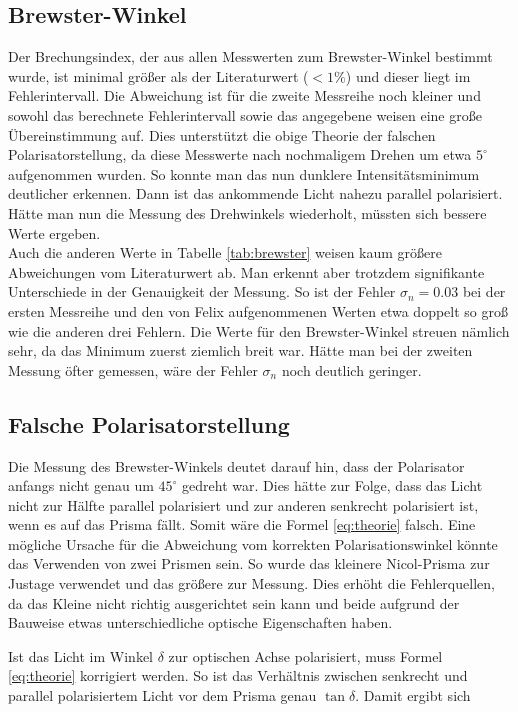\documentclass[12pt,a4paper,titlepage,headinclude,bibtotoc]{scrartcl}
\begin{document}
\subsection{Brewster-Winkel}
Der Brechungsindex, der aus allen Messwerten zum Brewster-Winkel bestimmt wurde, ist minimal größer als der Literaturwert ($< 1\%$) und dieser liegt im Fehlerintervall.
Die Abweichung ist für die zweite Messreihe noch kleiner und sowohl das berechnete Fehlerintervall sowie das angegebene weisen eine große Übereinstimmung auf.
Dies unterstützt die obige Theorie der falschen Polarisatorstellung, da diese Messwerte nach nochmaligem Drehen um etwa $5^\circ$ aufgenommen wurden.
So konnte man das nun dunklere Intensitätsminimum deutlicher erkennen.
Dann ist das ankommende Licht nahezu parallel polarisiert.
Hätte man nun die Messung des Drehwinkels wiederholt, müssten sich bessere Werte ergeben.\\

Auch die anderen Werte in Tabelle \ref{tab:brewster} weisen kaum größere Abweichungen vom Literaturwert ab.
Man erkennt aber trotzdem signifikante Unterschiede in der Genauigkeit der Messung.
So ist der Fehler $\sigma_n=0.03$ bei der ersten Messreihe und den von Felix aufgenommenen Werten etwa doppelt so groß wie die anderen drei Fehlern.
Die Werte für den Brewster-Winkel streuen nämlich sehr, da das Minimum zuerst ziemlich breit war.
Hätte man bei der zweiten Messung öfter gemessen, wäre der Fehler $\sigma_n$ noch deutlich geringer.

\subsection{Falsche Polarisatorstellung}
Die Messung des Brewster-Winkels deutet darauf hin, dass der Polarisator anfangs nicht genau um $45^\circ$ gedreht war.
Dies hätte zur Folge, dass das Licht nicht zur Hälfte parallel polarisiert und zur anderen senkrecht polarisiert ist, wenn es auf das Prisma fällt.
Somit wäre die Formel \eqref{eq:theorie} falsch.
Eine mögliche Ursache für die Abweichung vom korrekten Polarisationswinkel könnte das Verwenden von zwei Prismen sein.
So wurde das kleinere Nicol-Prisma zur Justage verwendet und das größere zur Messung.
Dies erhöht die Fehlerquellen, da das Kleine nicht richtig ausgerichtet sein kann und beide aufgrund der Bauweise etwas unterschiedliche optische Eigenschaften haben.

Ist das Licht im Winkel $\delta$ zur optischen Achse polarisiert, muss Formel \eqref{eq:theorie} korrigiert werden.
So ist das Verhältnis zwischen senkrecht und parallel polarisiertem Licht vor dem Prisma genau $\tan\delta$.
Damit ergibt sich
\end{document}
